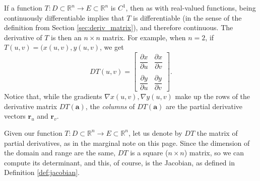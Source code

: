 
If a function $T:D\subset\mathbb{R}^n\to E\subset \mathbb{R}^n$ is $C^1$, then as with real-valued functions, being continuously differentiable implies that $T$ is differentiable (in the sense of the definition from Section \ref{sec:deriv_matrix}), and therefore continuous. The derivative of $T$ is then an $n\times n$ matrix. For example, when $n=2$, if $T(u,v) = (x(u,v), y(u,v)$, we get
\[
DT(u,v) = \begin{bmatrix}
\dfrac{\partial x}{\partial u}& \dfrac{\partial x}{\partial v}\\ & \\ \dfrac{\partial y}{\partial u}&\dfrac{\partial y}{\partial v}
\end{bmatrix}.
\]
Notice that, while the gradients $\nabla x(u,v), \nabla y(u,v)$ make up the rows of the derivative matrix $DT(\mathbf{a})$, the {\em columns} of $DT(\mathbf{a})$ are the partial derivative vectors $\mathbf{r}_u$ and $\mathbf{r}_v$.

Given our function $T:D\subset \mathbb{R}^n\to E\subset \mathbb{R}^n$, let us denote by $DT$ the matrix of partial derivatives, as in the marginal note on this page. Since the dimension of the domain and range are the same, $DT$ is a square ($n\times n$) matrix, so we can compute its determinant, and this, of course, is the Jacobian, as defined in Definition \ref{def:jacobian}.



